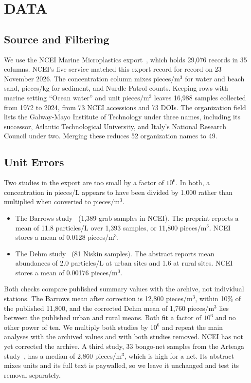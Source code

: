 \documentclass[12pt,a4paper]{report}
\begin{document}
\chapter{DATA}

\section{Source and Filtering}

We use the NCEI Marine Microplastics export~\cite{ncei}, which holds 29,076 records in 35 columns. NCEI's live service matched this export record for record on 23 November 2026. The concentration column mixes pieces/m$^3$ for water and beach sand, pieces/kg for sediment, and Nurdle Patrol counts. Keeping rows with marine setting ``Ocean water'' and unit pieces/m$^3$ leaves 16,988 samples collected from 1972 to 2024, from 73 NCEI accessions and 73 DOIs. The organization field lists the Galway-Mayo Institute of Technology under three names, including its successor, Atlantic Technological University, and Italy's National Research Council under two. Merging these reduces 52 organization names to 49.

\section{Unit Errors}

Two studies in the export are too small by a factor of $10^6$. In both, a concentration in pieces/L appears to have been divided by 1,000 rather than multiplied when converted to pieces/m$^3$.
\begin{itemize}
\item The Barrows study~\cite{barrows2018} (1,389 grab samples in NCEI). The preprint reports a mean of 11.8 particles/L over 1,393 samples, or 11,800 pieces/m$^3$. NCEI stores a mean of 0.0128 pieces/m$^3$.
\item The Dehm study~\cite{dehm2020} (81 Niskin samples). The abstract reports mean abundances of 2.0 particles/L at urban sites and 1.6 at rural sites. NCEI stores a mean of 0.00176 pieces/m$^3$.
\end{itemize}
Both checks compare published summary values with the archive, not individual stations. The Barrows mean after correction is 12,800 pieces/m$^3$, within 10\% of the published 11,800, and the corrected Dehm mean of 1,760 pieces/m$^3$ lies between the published urban and rural means. Both fit a factor of $10^6$ and no other power of ten. We multiply both studies by $10^6$ and repeat the main analyses with the archived values and with both studies removed. NCEI has not yet corrected the archive. A third study, 33 bongo-net samples from the Arteaga study~\cite{arteaga2024}, has a median of 2,860 pieces/m$^3$, which is high for a net. Its abstract mixes units and its full text is paywalled, so we leave it unchanged and test its removal separately.
\end{document}
